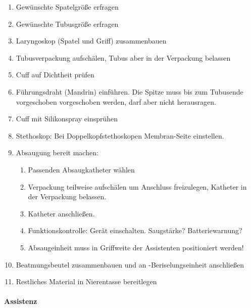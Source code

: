 \begin{enumerate}
    \item Gewünschte Spatelgröße erfragen
    \item Gewünschte Tubusgröße erfragen
    \item Laryngoskop (Spatel und Griff) zusammenbauen
    \item Tubusverpackung aufschälen, Tubus aber in der Verpackung belassen
    \item Cuff auf Dichtheit prüfen
    \item Führungsdraht (Mandrin) einführen. Die Spitze muss bis zum Tubusende
    vorgeschoben vorgeschoben werden, darf aber nicht herausragen.
    \item Cuff mit Silikonspray einsprühen
    \item Stethoskop: Bei Doppelkopfstethoskopen Membran-Seite einstellen.
    \item Absaugung bereit machen:
    \begin{enumerate}
        \item Passenden Absaugkatheter wählen
        \item Verpackung teilweise aufschälen um Anschluss freizulegen, Katheter
        in der Verpackung belassen.
        \item Katheter anschließen.
        \item Funktionskontrolle: Gerät einschalten. Saugstärke?
        Batteriewarnung?
\item Absaugeinheit muss in Griffweite der Assistenten positioniert werden! 
    \end{enumerate}
    \item Beatmungsbeutel zusammenbauen und an -Beriselungseinheit
    anschließen
    \item Restliches Material in Nierentasse bereitlegen
\end{enumerate}

\paragraph*{Assistenz}~


